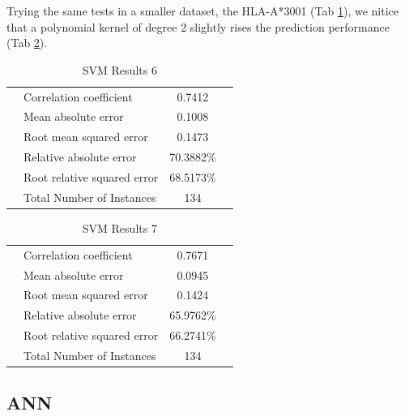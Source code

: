 Trying the same tests in a smaller dataset, the HLA-A*3001 (Tab \ref{tab:svm6}), we nitice that a polynomial kernel of degree 2 slightly rises the prediction performance (Tab \ref{tab:svm7}).

\begin{table}[ht]
\begin{center}
\begin{tabular}{ ll c r }
\hline
 & Correlation coefficient       &           0.7412 \\
 & Mean absolute error            &          0.1008 \\
 & Root mean squared error        &          0.1473 \\
 & Relative absolute error        &         70.3882\% \\
 & Root relative squared error    &         68.5173\% \\
 & Total Number of Instances      &        134 \\
\hline
\end{tabular}
\caption{SVM Results 6}\label{tab:svm6}
\end{center}
\end{table}


\begin{table}[ht]
\begin{center}
\begin{tabular}{ ll c r }
\hline
 & Correlation coefficient        &          0.7671 \\
 & Mean absolute error            &          0.0945 \\
 & Root mean squared error        &          0.1424 \\
 & Relative absolute error        &         65.9762\% \\
 & Root relative squared error    &         66.2741\% \\
 & Total Number of Instances      &        134 \\
\hline
\end{tabular}
\caption{SVM Results 7}\label{tab:svm7}
\end{center}
\end{table}

\subsection*{ANN}

